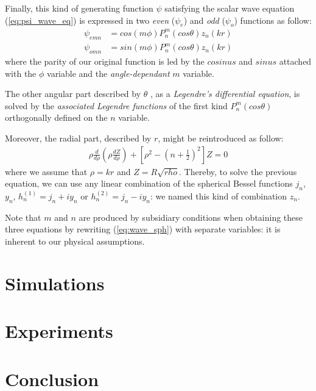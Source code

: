 \documentclass{article}
\begin{document}
Finally, this kind of generating function $\psi$ satisfying the scalar wave equation (\ref{eq:psi_wave_eq}) is expressed in two \textit{even} ($\psi_{e}$) and \textit{odd} ($\psi_{o}$) functions as follow:
\begin{align}
\psi_{emn}&=cos(m\phi)P_{n}^{m}(cos\theta)z_{n}(kr)\\
\psi_{omn}&=sin(m\phi)P_{n}^{m}(cos\theta)z_{n}(kr)
\end{align}
where the parity of our original function is led by the $cosinus$ and $sinus$ attached with the $\phi$ variable and the \textit{angle-dependant} $m$ variable. 

The other angular part described by $\theta$ , as a \textit{Legendre's differential equation}, is solved by the \textit{associated Legendre functions} of the first kind $P_{n}^{m}(cos\theta)$ orthogonally defined on the $n$ variable. 

Moreover, the radial part, described by $r$, might be reintroduced as follow:
\begin{align}
\rho\frac{d }{d\rho}(\rho\frac{d Z}{d\rho})+[\rho^{2}-(n+\frac{1}{2})^{2}]Z=0
\end{align}
where we assume that $\rho=kr$ and $Z=R\sqrt{rho}$. Thereby, to solve the previous equation, we can use any linear combination of the spherical Bessel functions $j_{n}$, $y_{n}$, $h^{(1)}_{n}=j_{n}+iy_{n}$ or $h^{(2)}_{n}=j_{n}-iy_{n}$: we named this kind of combination $z_{n}$.

Note that $m$ and $n$ are produced by subsidiary conditions when obtaining these three equations by rewriting (\ref{eq:wave_sph}) with separate variables: it is inherent to our physical assumptions.

\section{Simulations}

\section{Experiments}

\section{Conclusion}
\end{document}
